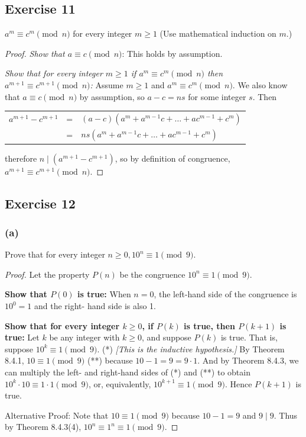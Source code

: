\documentclass[14pt]{extarticle}
\begin{document}
\subsection{Exercise 11}
\(a^m \equiv c^m \pmod n\) for every integer \(m \geq 1\) (Use mathematical induction on \(m\).)

\begin{proof}
{\it Show that \(a \equiv c \pmod n\)}: This holds by assumption.

{\it Show that for every integer \(m \geq 1\) if \(a^m \equiv c^m \pmod n\) then \(a^{m+1} \equiv c^{m+1} \pmod 
n\):} Assume \(m \geq 1\) and \(a^m \equiv c^m \pmod n\). We also know that \(a \equiv c \pmod n\) by assumption, so 
\(a-c = ns\) for some integer $s$. Then

\begin{center}
\begin{tabular}{rcl}
\(a^{m+1} - c^{m+1}\) & = & \((a-c)(a^{m} + a^{m-1}c + \ldots + ac^{m-1} + c^{m})\) \\
& = & \(ns(a^{m} + a^{m-1}c + \ldots + ac^{m-1} + c^{m})\) \\
\end{tabular}
\end{center}

therefore \(n \mid (a^{m+1}-c^{m+1})\), so by definition of congruence, \(a^{m+1} \equiv c^{m+1} \pmod n\).
\end{proof}

\subsection{Exercise 12}
\subsubsection{(a)}
Prove that for every integer \(n \geq 0, 10^n \equiv 1 \pmod 9\).

\begin{proof}
Let the property \(P(n)\) be the congruence \(10^n \equiv 1 \pmod 9\).

{\bf Show that \(P(0)\) is true:} When \(n = 0\), the left-hand side of the congruence is \(10^0 = 1\) and the right-
hand side is also 1.

{\bf Show that for every integer \(k \geq 0\), if \(P(k)\) is true, then \(P(k + 1)\) is true:} Let \(k\) be any 
integer with \(k \geq 0\), and suppose \(P(k)\) is true. That is, suppose \(10^k \equiv 1 \pmod 9\). (*) {\it [This 
is the inductive hypothesis.]} By Theorem 8.4.1, \(10 \equiv 1 \pmod 9\) (**) because \(10 - 1 = 9 = 9 \cdot 1\). 
And by Theorem 8.4.3, we can multiply the left- and right-hand sides of (*) and (**) to obtain \(10^k \cdot 10 \equiv 
1 \cdot 1 \pmod 9\), or, equivalently, \(10^{k+1} \equiv 1 \pmod 9\). Hence \(P(k + 1)\) is true.

Alternative Proof: Note that \(10 \equiv 1 \pmod 9\) because \(10 - 1 = 9\) and \(9 \mid 9\). Thus by Theorem 
8.4.3(4), \(10^n \equiv 1^n \equiv 1 \pmod 9\).
\end{proof}
\end{document}
